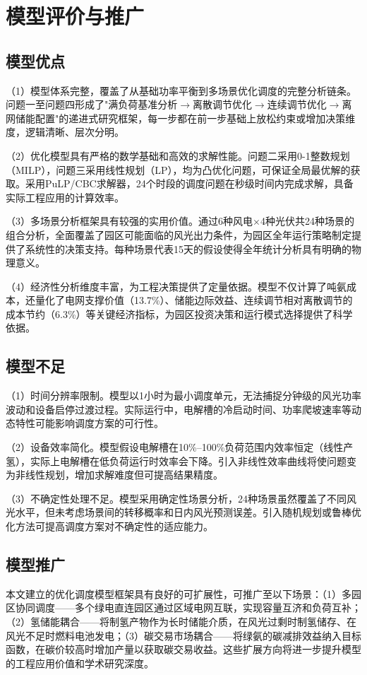 \section{模型评价与推广}

\subsection{模型优点}

（1）模型体系完整，覆盖了从基础功率平衡到多场景优化调度的完整分析链条。问题一至问题四形成了"满负荷基准分析$\rightarrow$离散调节优化$\rightarrow$连续调节优化$\rightarrow$离网储能配置"的递进式研究框架，每一步都在前一步基础上放松约束或增加决策维度，逻辑清晰、层次分明。

（2）优化模型具有严格的数学基础和高效的求解性能。问题二采用0-1整数规划（MILP），问题三采用线性规划（LP），均为凸优化问题，可保证全局最优解的获取。采用PuLP/CBC求解器，24个时段的调度问题在秒级时间内完成求解，具备实际工程应用的计算效率。

（3）多场景分析框架具有较强的实用价值。通过6种风电$\times$4种光伏共24种场景的组合分析，全面覆盖了园区可能面临的风光出力条件，为园区全年运行策略制定提供了系统性的决策支持。每种场景代表15天的假设使得全年统计分析具有明确的物理意义。

（4）经济性分析维度丰富，为工程决策提供了定量依据。模型不仅计算了吨氨成本，还量化了电网支撑价值（13.7\%）、储能边际效益、连续调节相对离散调节的成本节约（6.3\%）等关键经济指标，为园区投资决策和运行模式选择提供了科学依据。

\subsection{模型不足}

（1）时间分辨率限制。模型以1小时为最小调度单元，无法捕捉分钟级的风光功率波动和设备启停过渡过程。实际运行中，电解槽的冷启动时间、功率爬坡速率等动态特性可能影响调度方案的可行性。

（2）设备效率简化。模型假设电解槽在10\%--100\%负荷范围内效率恒定（线性产氢），实际上电解槽在低负荷运行时效率会下降。引入非线性效率曲线将使问题变为非线性规划，增加求解难度但可提高结果精度。

（3）不确定性处理不足。模型采用确定性场景分析，24种场景虽然覆盖了不同风光水平，但未考虑场景间的转移概率和日内风光预测误差。引入随机规划或鲁棒优化方法可提高调度方案对不确定性的适应能力。

\subsection{模型推广}

本文建立的优化调度模型框架具有良好的可扩展性，可推广至以下场景：（1）多园区协同调度——多个绿电直连园区通过区域电网互联，实现容量互济和负荷互补；（2）氢储能耦合——将制氢产物作为长时储能介质，在风光过剩时制氢储存、在风光不足时燃料电池发电；（3）碳交易市场耦合——将绿氨的碳减排效益纳入目标函数，在碳价较高时增加产量以获取碳交易收益。这些扩展方向将进一步提升模型的工程应用价值和学术研究深度。
